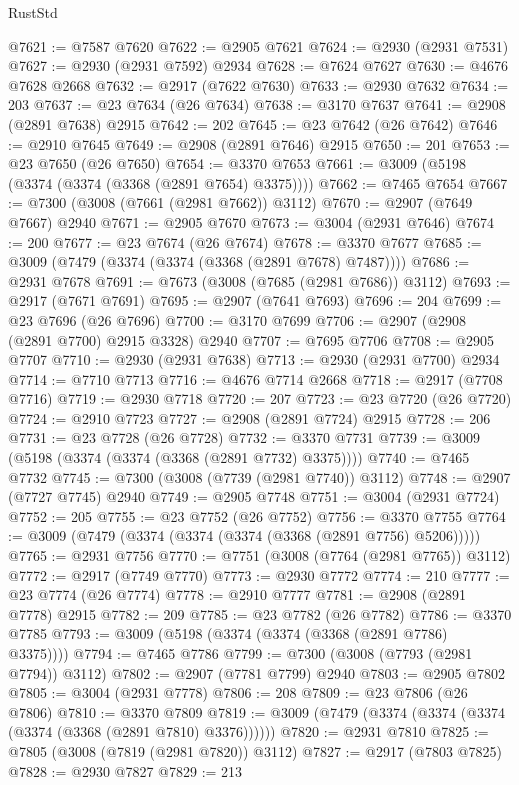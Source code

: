 \begin{lexlean}{RustStd}
\begin{coremodule}
@7621 := @7587 @7620
@7622 := @2905 @7621
@7624 := @2930 (@2931 @7531)
@7627 := @2930 (@2931 @7592) @2934
@7628 := @7624 @7627
@7630 := @4676 @7628 @2668
@7632 := @2917 (@7622 @7630)
@7633 := @2930 @7632
@7634 := 203
@7637 := @23 @7634 (@26 @7634)
@7638 := @3170 @7637
@7641 := @2908 (@2891 @7638) @2915
@7642 := 202
@7645 := @23 @7642 (@26 @7642)
@7646 := @2910 @7645
@7649 := @2908 (@2891 @7646) @2915
@7650 := 201
@7653 := @23 @7650 (@26 @7650)
@7654 := @3370 @7653
@7661 := @3009 (@5198 (@3374 (@3374 (@3368 (@2891 @7654) @3375))))
@7662 := @7465 @7654
@7667 := @7300 (@3008 (@7661 (@2981 @7662)) @3112)
@7670 := @2907 (@7649 @7667) @2940
@7671 := @2905 @7670
@7673 := @3004 (@2931 @7646)
@7674 := 200
@7677 := @23 @7674 (@26 @7674)
@7678 := @3370 @7677
@7685 := @3009 (@7479 (@3374 (@3374 (@3368 (@2891 @7678) @7487))))
@7686 := @2931 @7678
@7691 := @7673 (@3008 (@7685 (@2981 @7686)) @3112)
@7693 := @2917 (@7671 @7691)
@7695 := @2907 (@7641 @7693)
@7696 := 204
@7699 := @23 @7696 (@26 @7696)
@7700 := @3170 @7699
@7706 := @2907 (@2908 (@2891 @7700) @2915 @3328) @2940
@7707 := @7695 @7706
@7708 := @2905 @7707
@7710 := @2930 (@2931 @7638)
@7713 := @2930 (@2931 @7700) @2934
@7714 := @7710 @7713
@7716 := @4676 @7714 @2668
@7718 := @2917 (@7708 @7716)
@7719 := @2930 @7718
@7720 := 207
@7723 := @23 @7720 (@26 @7720)
@7724 := @2910 @7723
@7727 := @2908 (@2891 @7724) @2915
@7728 := 206
@7731 := @23 @7728 (@26 @7728)
@7732 := @3370 @7731
@7739 := @3009 (@5198 (@3374 (@3374 (@3368 (@2891 @7732) @3375))))
@7740 := @7465 @7732
@7745 := @7300 (@3008 (@7739 (@2981 @7740)) @3112)
@7748 := @2907 (@7727 @7745) @2940
@7749 := @2905 @7748
@7751 := @3004 (@2931 @7724)
@7752 := 205
@7755 := @23 @7752 (@26 @7752)
@7756 := @3370 @7755
@7764 := @3009 (@7479 (@3374 (@3374 (@3374 (@3368 (@2891 @7756) @5206)))))
@7765 := @2931 @7756
@7770 := @7751 (@3008 (@7764 (@2981 @7765)) @3112)
@7772 := @2917 (@7749 @7770)
@7773 := @2930 @7772
@7774 := 210
@7777 := @23 @7774 (@26 @7774)
@7778 := @2910 @7777
@7781 := @2908 (@2891 @7778) @2915
@7782 := 209
@7785 := @23 @7782 (@26 @7782)
@7786 := @3370 @7785
@7793 := @3009 (@5198 (@3374 (@3374 (@3368 (@2891 @7786) @3375))))
@7794 := @7465 @7786
@7799 := @7300 (@3008 (@7793 (@2981 @7794)) @3112)
@7802 := @2907 (@7781 @7799) @2940
@7803 := @2905 @7802
@7805 := @3004 (@2931 @7778)
@7806 := 208
@7809 := @23 @7806 (@26 @7806)
@7810 := @3370 @7809
@7819 := @3009 (@7479 (@3374 (@3374 (@3374 (@3374 (@3368 (@2891 @7810) @3376))))))
@7820 := @2931 @7810
@7825 := @7805 (@3008 (@7819 (@2981 @7820)) @3112)
@7827 := @2917 (@7803 @7825)
@7828 := @2930 @7827
@7829 := 213

\end{coremodule}
\end{lexlean}
